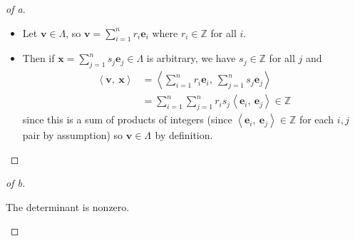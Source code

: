 \begin{solution}

\envlist

\begin{proof}[of a]

\envlist

\begin{itemize}
\item
  Let \(\mathbf{v} \in \Lambda\), so
  \(\mathbf{v} = \sum_{i=1}^n r_i \mathbf{e}_i\) where
  \(r_i \in {\mathbb{Z}}\) for all \(i\).
\item
  Then if \(\mathbf{x} = \sum_{j=1}^n s_j \mathbf{e}_j \in \Lambda\) is
  arbitrary, we have \(s_j \in {\mathbb{Z}}\) for all \(j\) and
  \begin{align*}
  {\left\langle {\mathbf{v}},~{\mathbf{x}} \right\rangle} 
  &= {\left\langle {\sum_{i=1}^n r_i \mathbf{e}_i},~{\sum_{j=1}^n s_j \mathbf{e}_j } \right\rangle} \\
  &= \sum_{i=1}^n \sum_{j=1}^n r_i s_j {\left\langle {\mathbf{e}_i},~{\mathbf{e}_j } \right\rangle}  \in {\mathbb{Z}}
  \end{align*}
  since this is a sum of products of integers (since
  \({\left\langle {\mathbf{e}_i},~{\mathbf{e}_j} \right\rangle} \in {\mathbb{Z}}\)
  for each \(i, j\) pair by assumption) so
  \(\mathbf{v} \in \Lambda {}^{ \check{} }\) by definition.
\end{itemize}

\end{proof}

\begin{proof}[of b]

\begin{claim}

The determinant is nonzero.

\end{claim}


\end{proof}
\end{solution}
